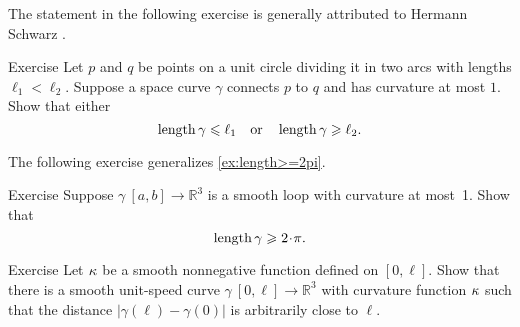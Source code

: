 The statement in the following exercise is generally attributed to Hermann Schwarz \cite{shur}.

\begin{thm}{Exercise}\label{ex:schwartz}
Let $p$ and $q$ be points on a unit circle dividing it in two arcs with lengths $\ell_1<\ell_2$.
Suppose a space curve $\gamma$ connects $p$ to $q$ and has curvature at most $1$.
Show that either
\[\mathop{\rm length}\nolimits \gamma\leqslant \ell_1
\quad\text{or}\quad
\mathop{\rm length}\nolimits \gamma\geqslant \ell_2.
\]
\end{thm}

The following exercise generalizes \ref{ex:length>=2pi}.

\begin{thm}{Exercise}\label{ex:loop}
Suppose $\gamma\:[a,b]\to \mathbb{R}^3$ is a smooth loop with curvature at most~1.
Show that 
\[\length\gamma\ge2\cdot\pi.\]

\end{thm}

\begin{thm}{Exercise}\label{ex:bow-upper}
Let $\kappa$ be a smooth nonnegative function defined on $[0,\ell]$.
Show that there is a smooth unit-speed curve $\gamma\:[0,\ell]\to\mathbb{R}^3$ with curvature function $\kappa$ such that the distance $|\gamma(\ell)-\gamma(0)|$ is arbitrarily close to $\ell$.
\end{thm}
